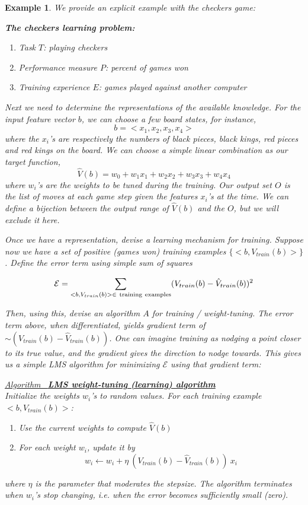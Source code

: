 \documentclass[12pt]{article}  %
\newtheorem{example}{Example}
\newcommand{\algtitle}[1]{\underline{Algorithm \ {\bf #1}} \vspace*{1mm}\\}
\begin{document}
\begin{example}
We provide an explicit example with the checkers game:

{\bf The checkers learning problem:}
\begin{enumerate}
\item Task $T$: playing checkers
\item Performance measure $P$: percent of games won
\item Training experience $E$: games played against another computer
\end{enumerate}

Next we need to determine the representations of the available knowledge. For the input feature vector $b$, we can choose a few board states, for instance, 
$$b = <x_1, x_2, x_3, x_4>$$
where the $x_i$'s are respectively the numbers of black pieces, black kings, red pieces and red kings on the board. We can choose a simple linear combination as our target function,
$$\hat{V}(b) = w_0 + w_1 x_1 + w_2 x_2 + w_3 x_3 + w_4 x_4$$
where $w_i$'s are the weights to be tuned during the training. Our output set $O$ is the list of moves at each game step given the features $x_i$'s at the time. We can define a bijection between the output range of $\hat{V}(b)$ and the $O$, but we will exclude it here.

Once we have a representation, devise a learning mechanism for training. Suppose now we have a set of positive (games won) training examples $\{<b, V_{train}(b)>\}$. Define the error term using simple sum of squares

$$\mathcal{E} = \sum_{<b, V_{train}(b)> \in \ {\rm training\ examples}} (V_{train}(b) - \hat{V}_{train}(b))^2$$

Then, using this, devise an algorithm $A$ for training / weight-tuning. The error term above, when differentiated, yields gradient term of $\sim(V_{train}(b) - \hat{V}_{train}(b))$. One can imagine training as nodging a point closer to its true value, and the gradient gives the direction to nodge towards. This gives us a simple LMS algorithm for minimizing $\mathcal{E}$ using that gradient term:


\algtitle{LMS weight-tuning (learning) algorithm}
Initialize the weights $w_i$'s to random values. For each training example $<b, V_{train}(b)>$:
\begin{enumerate}
	\item Use the current weights to compute $\hat{V}(b)$
	\item For each weight $w_i$, update it by $$w_i \leftarrow w_i + \eta \ (V_{train}(b) - \hat{V}_{train}(b)) \ x_i$$
\end{enumerate}

where $\eta$ is the parameter that moderates the stepsize. The algorithm terminates when $w_i$'s stop changing, i.e. when the error becomes sufficiently small (zero).

\end{example}
\end{document}

